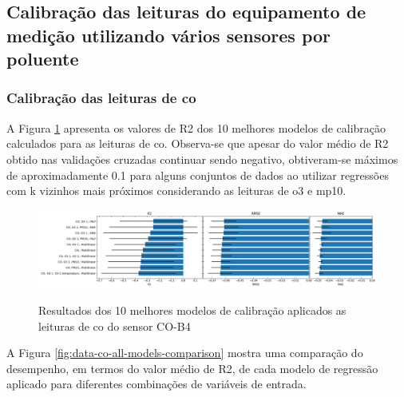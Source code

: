 \subsection{Calibração das leituras do equipamento de medição utilizando vários sensores por poluente}

\subsubsection{Calibração das leituras de \acrshort{co}}

A Figura \ref{fig:data-co-all-models-performance} apresenta os valores de R2 dos 10 melhores modelos de calibração calculados para as leituras de \acrshort{co}. Observa-se que apesar do valor médio de R2 obtido nas validações cruzadas continuar sendo negativo, obtiveram-se máximos de aproximadamente 0.1 para alguns conjuntos de dados ao utilizar regressões com k vizinhos mais próximos considerando as leituras de \acrshort{o3} e \acrshort{mp10}.

\begin{figure}[h]
    \centering
    \caption{Resultados dos 10 melhores modelos de calibração aplicados as leituras de \acrshort{co} do sensor CO-B4}
    \includegraphics[width=\textwidth]{chapters/3-RESULTADOS CAMPO/Figuras/co-all-models-performance.png}
    \label{fig:data-co-all-models-performance}
\end{figure}

A Figura \ref{fig:data-co-all-models-comparison} mostra uma comparação do desempenho, em termos do valor médio de R2, de cada modelo de regressão aplicado para diferentes combinações de variáveis de entrada.

